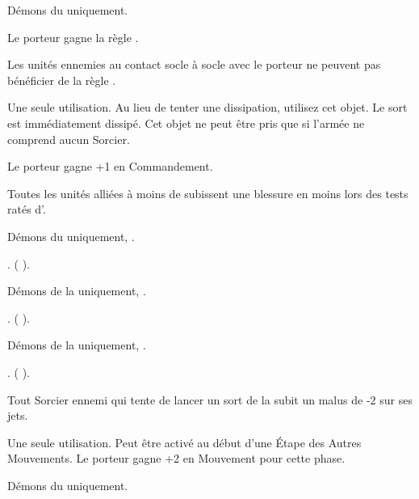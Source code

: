 \newpage
\begin{multicols}{2}\raggedcolumns

\subtitle{Objets enchantés démoniaques}\vspace{5pt}

\startpricelist

Démons du \textbf{\dchange} uniquement.

Le porteur gagne la règle .

Les unités ennemies au contact socle à socle avec le porteur ne peuvent pas bénéficier de la règle \holdyourground{}.

Une seule utilisation. Au lieu de tenter une dissipation, utilisez cet objet. Le sort est immédiatement dissipé. Cet objet ne peut être pris que si l'armée ne comprend aucun Sorcier.

Le porteur gagne +1 en Commandement.

Toutes les unités alliées à moins de  subissent une blessure en moins lors des tests ratés d'\daemonicinstability{}.

Démons du \textbf{\dchange} uniquement, \oneofakind{}.

. \changespelltwo{} (\Pathof{} \change{}).

Démons de la \textbf{\dlust} uniquement, \oneofakind{}.

. \lustspellthree{} (\Pathof{} \lust{}).

Démons de la \textbf{\pestilence} uniquement, \oneofakind{}.

. \diseasespelltwo{} (\Pathof{} \disease{}).

Tout Sorcier ennemi qui tente de lancer un sort de la \Pathof{} \light{} subit un malus de -2 sur ses jets.

Une seule utilisation. Peut être activé au début d'une Étape des Autres Mouvements. Le porteur gagne +2 en Mouvement pour cette phase.

\endpricelist

\subtitle{Objets cabalistiques démoniaques}\vspace{5pt}

\startpricelist

Démons du \textbf{\dchange} uniquement.


\end{multicols}
